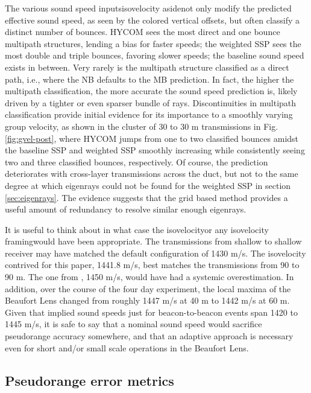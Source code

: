 The various sound speed inputs\textemdash isovelocity aside\textemdash not only modify the predicted effective sound speed, as seen by the colored vertical offsets, but often classify a distinct number of bounces.
HYCOM sees the most direct and one bounce multipath structures, lending a bias for faster speeds; the weighted SSP sees the most double and triple bounces, favoring slower speeds; the baseline sound speed exists in between.
Very rarely is the multipath structure classified as a direct path, i.e., where the NB defaults to the MB prediction.
In fact, the higher the multipath classification, the more accurate the sound speed prediction is, likely driven by a tighter or even sparser bundle of rays.
 Discontinuities in multipath classification provide initial evidence for its importance to a smoothly varying group velocity, as shown in the cluster of 30 to 30 m transmissions in Fig. \ref{fig:gvel-post}, where HYCOM jumps from one to two classified bounces amidst the baseline SSP and weighted SSP smoothly increasing while consistently seeing two and three classified bounces, respectively.
Of course, the prediction deteriorates with cross-layer transmissions across the duct, but not to the same degree at which eigenrays could not be found for the weighted SSP in section \ref{sec:eigenrays}.
The evidence suggests that the grid based method provides a useful amount of redundancy to resolve similar enough eigenrays.

It is useful to think about in what case the isovelocity\textemdash or any isovelocity framing\textemdash would have been appropriate.
The transmissions from shallow to shallow receiver may have matched the default configuration of 1430 m/s.
The isovelocity contrived for this paper, 1441.8 m/s, best matches the transmissions from 90 to 90 m.
The one from \citet{Graupe2019}, 1450 m/s, would have had a systemic overestimation.
In addition, over the course of the four day experiment, the local maxima of the Beaufort Lens changed from roughly 1447 m/s at 40 m to 1442 m/s at 60 m.
Given that implied sound speeds just for beacon-to-beacon events span 1420 to 1445 m/s, it is safe to say that a nominal sound speed would sacrifice pseudorange accuracy somewhere, and that an adaptive approach is necessary even for short and/or small scale operations in the Beaufort Lens.

\subsection{Pseudorange error metrics}

